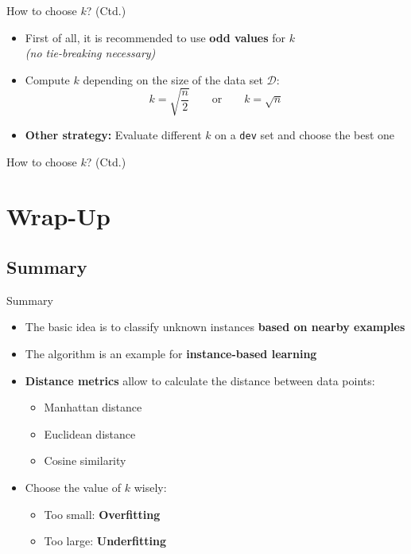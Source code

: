 \begin{frame}{How to choose $k$? (Ctd.)}{}
	\begin{itemize}
		\item First of all, it is recommended to use \textbf{odd values} for $k$ \\
			{\footnotesize \textit{(no tie-breaking necessary)}}
		\item Compute $k$ depending on the size of the data set $\mathcal{D}$:
		\begin{equation}
			k = \sqrt{\frac{n}{2}} \qquad \text{or} \qquad k = \sqrt{n}
		\end{equation}
		\item \textbf{Other strategy:} Evaluate different $k$ on a \texttt{dev} set and choose the best one
	\end{itemize}
\end{frame}


\begin{frame}{How to choose $k$? (Ctd.)}{}
	
\end{frame}


\section{Wrap-Up}

\subsection{Summary}

\begin{frame}{Summary}{}
	\begin{itemize}
		\item The basic idea is to classify unknown instances \textbf{based on nearby examples}
		\item The algorithm is an example for \textbf{instance-based learning}
		\item \textbf{Distance metrics} allow to calculate the distance between data points:
		\begin{itemize}
			\item Manhattan distance
			\item Euclidean distance
			\item Cosine similarity
		\end{itemize}
		\item Choose the value of $k$ wisely:
		\begin{itemize}
			\item Too small: \textbf{Overfitting}
			\item Too large: \textbf{Underfitting}
		\end{itemize}
	\end{itemize}
\end{frame}



